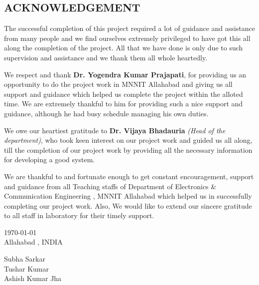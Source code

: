 \begin{center}
\section*{ACKNOWLEDGEMENT}
\end{center}
\begin{Large}
\begin{onehalfspace}
The successful completion of this project required a lot of guidance and assistance from many people and we find ourselves extremely privileged to have got this all along the completion of the project. All that we have done is only due to such supervision and assistance and we thank them all whole heartedly.

We respect and thank \textbf{Dr. Yogendra Kumar Prajapati}, for providing us an opportunity to do the project work in MNNIT Allahabad and giving us all support and guidance which helped us complete the project within the alloted time. We are extremely thankful to him for providing such a nice support and guidance, although he had busy schedule managing his own duties.

We owe our heartiest gratitude to \textbf{Dr. Vijaya Bhadauria} \textit{(Head of the department)}, who took keen interest on our project work and guided us all along, till the completion of our project work by providing all the necessary information for developing a good system.

We are thankful to and fortunate enough to get constant encouragement, support and guidance from all Teaching staffs of Department of Electronics \& Communication Engineering , MNNIT Allahabad which helped us in successfully completing our project work. Also, We would like to extend our sincere gratitude to all staff in laboratory for their timely support.

\end{onehalfspace}
\end{Large}

\begin{Large}
\begin{onehalfspace}
\begin{flushleft}
\today \\
Allahabad , INDIA
\end{flushleft}
\end{onehalfspace}
\end{Large}

\begin{Large}
\begin{onehalfspace}
\begin{flushright}
Subha Sarkar \\[0.2in]
Tushar Kumar \\[0.2in]
Ashish Kumar Jha \\[0.1in]
\end{flushright}
\end{onehalfspace}
\end{Large}